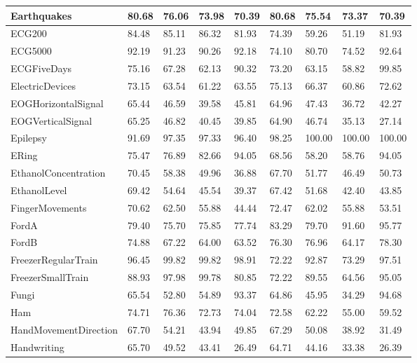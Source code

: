 \begin{landscape}
\begin{longtable}{|l|llll|llll|}
    Earthquakes & 80.68 & 76.06 & 73.98 & 70.39 & 80.68 & 75.54 & 73.37 & 70.39 \\ \hline
    ECG200 & 84.48 & 85.11 & 86.32 & 81.93 & 74.39 & 59.26 & 51.19 & 81.93 \\ \hline
    ECG5000 & 92.19 & 91.23 & 90.26 & 92.18 & 74.10 & 80.70 & 74.52 & 92.64 \\ \hline
    ECGFiveDays & 75.16 & 67.28 & 62.13 & 90.32 & 73.20 & 63.15 & 58.82 & 99.85 \\ \hline
    ElectricDevices & 73.15 & 63.54 & 61.22 & 63.55 & 75.13 & 66.37 & 60.86 & 72.62 \\ \hline
    EOGHorizontalSignal & 65.44 & 46.59 & 39.58 & 45.81 & 64.96 & 47.43 & 36.72 & 42.27 \\ \hline
    EOGVerticalSignal & 65.25 & 46.82 & 40.45 & 39.85 & 64.90 & 46.74 & 35.13 & 27.14 \\ \hline
    Epilepsy & 91.69 & 97.35 & 97.33 & 96.40 & 98.25 & 100.00 & 100.00 & 100.00 \\ \hline
    ERing & 75.47 & 76.89 & 82.66 & 94.05 & 68.56 & 58.20 & 58.76 & 94.05 \\ \hline
    EthanolConcentration & 70.45 & 58.38 & 49.96 & 36.88 & 67.70 & 51.77 & 46.49 & 50.73 \\ \hline
    EthanolLevel & 69.42 & 54.64 & 45.54 & 39.37 & 67.42 & 51.68 & 42.40 & 43.85 \\ \hline
    FingerMovements & 70.62 & 62.50 & 55.88 & 44.44 & 72.47 & 62.02 & 55.88 & 53.51 \\ \hline
    FordA & 79.40 & 75.70 & 75.85 & 77.74 & 83.29 & 79.70 & 91.60 & 95.77 \\ \hline
    FordB & 74.88 & 67.22 & 64.00 & 63.52 & 76.30 & 76.96 & 64.17 & 78.30 \\ \hline
    FreezerRegularTrain & 96.45 & 99.82 & 99.82 & 98.91 & 72.22 & 92.87 & 73.29 & 97.51 \\ \hline
    FreezerSmallTrain & 88.93 & 97.98 & 99.78 & 80.85 & 72.22 & 89.55 & 64.56 & 95.05 \\ \hline
    Fungi & 65.54 & 52.80 & 54.89 & 93.37 & 64.86 & 45.95 & 34.29 & 94.68 \\ \hline
    Ham & 74.71 & 76.36 & 72.73 & 74.04 & 72.58 & 62.22 & 55.00 & 59.52 \\ \hline
    HandMovementDirection & 67.70 & 54.21 & 43.94 & 49.85 & 67.29 & 50.08 & 38.92 & 31.49 \\ \hline
    Handwriting & 65.70 & 49.52 & 43.41 & 26.49 & 64.71 & 44.16 & 33.38 & 26.39 \\ \hline

\end{longtable}
\end{landscape}
